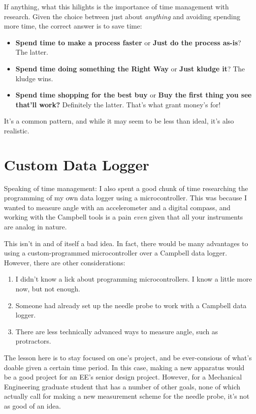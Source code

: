 If anything, what this hilights is the importance of time management
with research. Given the choice between just about \emph{anything} and
avoiding spending more time, the correct answer is to save time:

\begin{itemize}
\item
  \textbf{Spend time to make a process faster} or \textbf{Just do the
  process as-is}? The latter.
\item
  \textbf{Spend time doing something the Right Way} or \textbf{Just
  kludge it}? The kludge wins.
\item
  \textbf{Spend time shopping for the best buy} or \textbf{Buy the first
  thing you see that'll work?} Definitely the latter. That's what grant
  money's for!
\end{itemize}
It's a common pattern, and while it may seem to be less than ideal, it's
also realistic.

\section{Custom Data Logger}

Speaking of time management: I also spent a good chunk of time
researching the programming of my own data logger using a
microcontroller. This was because I wanted to measure angle with an
accelerometer and a digital compass, and working with the Campbell tools
is a pain \emph{even} given that all your instruments are analog in
nature.

This isn't in and of itself a bad idea. In fact, there would be many
advantages to using a custom-programmed microcontroller over a Campbell
data logger. However, there are other considerations:

\begin{enumerate}
\item
  I didn't know a lick about programming microcontrollers. I know a
  little more now, but not enough.
\item
  Someone had already set up the needle probe to work with a Campbell
  data logger.
\item
  There are less technically advanced ways to measure angle, such as
  protractors.
\end{enumerate}
The lesson here is to stay focused on one's project, and be
ever-consious of what's doable given a certain time period. In this
case, making a new apparatus would be a good project for an EE's senior
design project. However, for a Mechanical Engineering graduate student
that has a number of other goals, none of which actually call for making
a new measurement scheme for the needle probe, it's not as good of an
idea.

